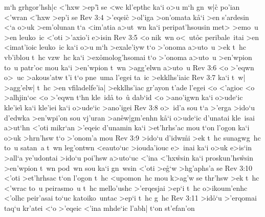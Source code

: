 m`h
grhgor'hsh|c
<'hxw
>ep'i\r{}
se
<wc
kl'epthc
ka`i
o>u
m`h
gn~w|c\r{}
po'ian
<'wran
<'hxw
>ep'i
se\bibvsend
\vs Rev 3:4
>'eqeic\r{}
>ol'iga
>on'omata
k\r{a}`i
>en
s'ardesin
<`a
o>uk
>em'olunan
t`a
<im'atia
a>ut~wn
ka`i
peripat'hsousin
met>
>emo~u
>en
leuko~ic
<'oti
>'axio'i
e>isin\bibvsend
\vs Rev 3:5
<o
nik~wn
o<~ut\r{o}c
peribale~itai
>en
<imat'ioic
leuko~ic
ka`i
o>u
m`h
>exale'iyw
t`o
>'onoma
a>uto~u
>ek
t~hc
vb'iblou
t~hc
vzw~hc
ka`i
>ex\r{o}molog'hsomai
t`o
>'onoma
a>uto~u
>en'wpion
to~u
patr'oc
mou
ka`i
>en'wpion
t~wn
>agg'elwn
a>uto~u\bibvsend
\vs Rev 3:6
<o
>'eqwn
o>~uc
>akous'atw
t'i
t`o
pne~uma
l'egei
ta~ic
>ekklhs'iaic\bibvsend
\vs Rev 3:7
ka`i
t~w|
>agg'elw|
t~hc
>en
vfiladelfe'ia|
>ekklhs'iac
gr'ayon
t'ade
l'egei
<o
<'agioc
<o
>alhjin`oc
<o
>'eqwn
t`hn
kle~id\r{a}
to~u\r{}
dab`id
<o
>ano'igwn
ka`i
o>ude`ic
kle'iei\r{}
ka`i
kle'iei
ka`i
o>ude`ic
>ano'igei\bibvsend
\vs Rev 3:8
o>~id'a
sou
t`a
>'erga
>ido`u
d'edwka
>en'wpi'on
sou
vj'uran
>an\r{e}w|gm'enhn
k\r{a}`i
o>ude`ic
d'unatai
kle~isai
a>ut`hn
<'oti
mikr`an
>'eqeic
d'unamin
ka`i
>et'hrhs'ac
mou
t`on
l'ogon
ka`i
o>uk
>hrn'hsw
t`o
>'onom'a
mou\bibvsend
\vs Rev 3:9
>ido`u
d'idw\r{m}i
>ek
t~hc
sunagwg~hc
to~u
satan~a
t~wn
leg'ontwn
<eauto`uc
>iouda'iouc
e>~inai
ka`i
o>uk
e>is`in
>all`a
ye'udontai
>ido`u
poi'hsw
a>uto`uc
<'ina
<'hx\r{w}sin
ka`i
proskun'hs\r{w}sin
>en'wpion
t~wn
pod~wn
sou
ka`i
gn~wsin
<'oti
>e\r{g}`w
>hg'aphs'a
se\bibvsend
\vs Rev 3:10
<'oti
>et'hrhsac
t`on
l'ogon
t~hc
<upomon~hc
mou
k>ag'w
se
thr'hsw
>ek
t~hc
<'wrac
to~u
peirasmo~u
t~hc
mello'ushc
>'erqesjai
>ep`i
t~hc
o>ikoum'enhc
<'olhc
peir'asai
to`uc
katoiko~untac
>ep`i
t~hc
g~hc\bibvsend
\vs Rev 3:11
>id\r{o}`u
>'erqomai
taq`u
kr'atei
<`o
>'eqeic
<'ina
mhde`ic
l'abh|
t`on
st'efan'on
